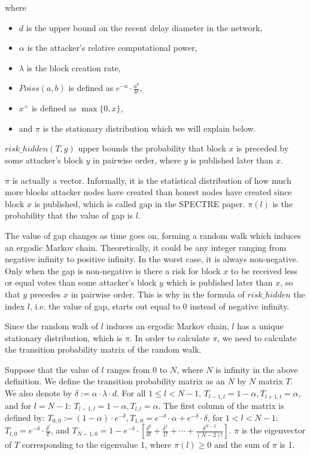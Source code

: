 \documentclass[a4paper,11pt]{article}
\begin{document}
where

\begin{itemize}
	\item $d$ is the upper bound on the recent delay diameter in the network,
	\item $\alpha$ is the attacker’s relative computational power,
	\item $\lambda$ is the block creation rate,
	\item $Poiss(a, b)$ is defined as $e^{-a} \cdot \frac{a^b}{b!}$,
	\item $x^+$ is defined as $\max\{0, x\}$,
	\item and $\pi$ is the stationary distribution which we will explain below.
\end{itemize}

$risk\_hidden(T,g)$ upper bounds the probability that block $x$ is preceded by
some attacker’s block $y$ in pairwise order, where $y$ is published later than
$x$.

$\pi$ is actually a vector. Informally, it is the statistical distribution of
how much more blocks attacker nodes have created than honest nodes have created
since block $x$ is published, which is called gap in the SPECTRE paper. $\pi(l)$
is the probability that the value of gap is $l$.

The value of gap changes as time goes on, forming a random walk which induces an
ergodic Markov chain. Theoretically, it could be any integer ranging from
negative infinity to positive infinity. In the worst case, it is always
non-negative. Only when the gap is non-negative is there a risk for block $x$ to
be received less or equal votes than some attacker’s block $y$ which is
published later than $x$, so that $y$ precedes $x$ in pairwise order. This is
why in the formula of $risk\_hidden$ the index $l$, i.e. the value of gap,
starts out equal to 0 instead of negative infinity.

Since the random walk of $l$ induces an ergodic Markov chain, $l$ has a unique
stationary distribution, which is $\pi$. In order to calculate $\pi$, we need to
calculate the transition probability matrix of the random walk.

Suppose that the value of $l$ ranges from 0 to $N$, where $N$ is infinity in the
above definition. We define the transition probability matrix as an $N$ by $N$
matrix $T$. We also denote by $\delta := \alpha \cdot \lambda \cdot d$. For all
$1 \leq l < N - 1$, $T_{l-1,l} = 1 - \alpha, T_{l+1,l} = \alpha$, and for $l = N
- 1$: $T_{l-1,l} = 1 - \alpha, T_{l,l} = \alpha$. The first column of the matrix
is defined by: $T_{0,0} := (1 - \alpha) \cdot e^{-\delta}, T_{1,0} = e^{-\delta}
\cdot \alpha + e^{-\delta} \cdot \delta$, for $1 < l < N - 1$: $T_{l,0} =
e^{-\delta} \cdot \frac{\delta^l}{l!}$, and $T_{N-1,0} = 1 - e^{-\delta} \cdot
\left[\frac{\delta^0}{0!} + \frac{\delta^1}{1!} + \cdots +
\frac{\delta^{N-2}}{(N-2)!}\right]$.  $\pi$ is the eigenvector of $T$
corresponding to the eigenvalue 1, where $\pi(l) \geq 0$ and the sum of $\pi$ is
1.
\end{document}
